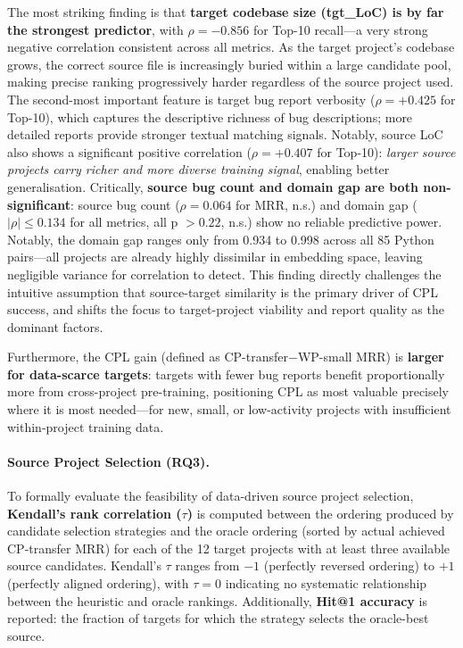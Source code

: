 \documentclass[12pt,table,xcdraw]{article}
\begin{document}
The most striking finding is that \textbf{target codebase size (tgt\_LoC) is by far the strongest predictor}, with $\rho = -0.856$ for Top-10 recall---a very strong negative correlation consistent across all metrics. As the target project's codebase grows, the correct source file is increasingly buried within a large candidate pool, making precise ranking progressively harder regardless of the source project used. The second-most important feature is target bug report verbosity ($\rho = +0.425$ for Top-10), which captures the descriptive richness of bug descriptions; more detailed reports provide stronger textual matching signals. Notably, source LoC also shows a significant positive correlation ($\rho = +0.407$ for Top-10): \textit{larger source projects carry richer and more diverse training signal}, enabling better generalisation. Critically, \textbf{source bug count and domain gap are both non-significant}: source bug count ($\rho = 0.064$ for MRR, n.s.) and domain gap ($|\rho| \leq 0.134$ for all metrics, all p $> 0.22$, n.s.) show no reliable predictive power. Notably, the domain gap ranges only from 0.934 to 0.998 across all 85 Python pairs---all projects are already highly dissimilar in embedding space, leaving negligible variance for correlation to detect. This finding directly challenges the intuitive assumption that source-target similarity is the primary driver of CPL success, and shifts the focus to target-project viability and report quality as the dominant factors.

Furthermore, the CPL gain (defined as CP-transfer$-$WP-small MRR) is \textbf{larger for data-scarce targets}: targets with fewer bug reports benefit proportionally more from cross-project pre-training, positioning CPL as most valuable precisely where it is most needed---for new, small, or low-activity projects with insufficient within-project training data.

\paragraph{Source Project Selection (RQ3).}
To formally evaluate the feasibility of data-driven source project selection, \textbf{Kendall's rank correlation ($\tau$)} is computed between the ordering produced by candidate selection strategies and the oracle ordering (sorted by actual achieved CP-transfer MRR) for each of the 12 target projects with at least three available source candidates. Kendall's $\tau$ ranges from $-1$ (perfectly reversed ordering) to $+1$ (perfectly aligned ordering), with $\tau = 0$ indicating no systematic relationship between the heuristic and oracle rankings. Additionally, \textbf{Hit@1 accuracy} is reported: the fraction of targets for which the strategy selects the oracle-best source.
\end{document}

